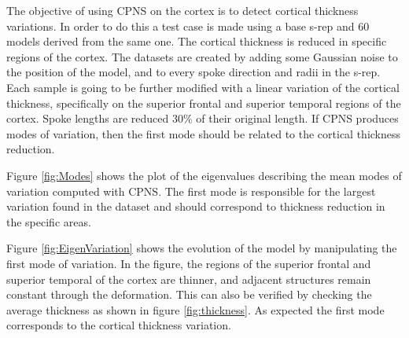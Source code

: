 The objective of using CPNS on the cortex is to detect cortical thickness variations.
In order to do this a test case is made using a base s-rep and 60 models derived from the same one.
The cortical thickness is reduced in specific regions of the cortex.
The datasets are created by adding some Gaussian noise to the position of the model, and to every spoke direction and radii in the s-rep. 
Each sample is going to be further modified with a linear variation of the cortical thickness,
specifically on the superior frontal and superior temporal regions of the cortex.
Spoke lengths are reduced $30\%$ of their original length.
If CPNS produces modes of variation, then the first mode should be related to the cortical thickness reduction.

Figure \ref{fig:Modes} shows the plot of the eigenvalues describing the mean modes of variation computed with CPNS.
The first mode is responsible for the largest variation found in the dataset and should correspond to 
thickness reduction in the specific areas. 

Figure \ref{fig:EigenVariation} shows the evolution of the model by manipulating the first mode of
variation. In the figure, the regions of the superior frontal
and superior temporal of the cortex are thinner, and adjacent structures remain constant through the deformation.
This can also be verified by checking the average thickness as shown in figure \ref{fig:thickness}.
As expected the first mode corresponds to the cortical thickness variation.

\begin{figure*}  
  \centering
  \caption[S-rep deformation using the first mode.]{Deforming the s-rep model using the first mode of variation and comparing it against the base s-rep.}
  \label{fig:EigenVariation}   
\end{figure*}

